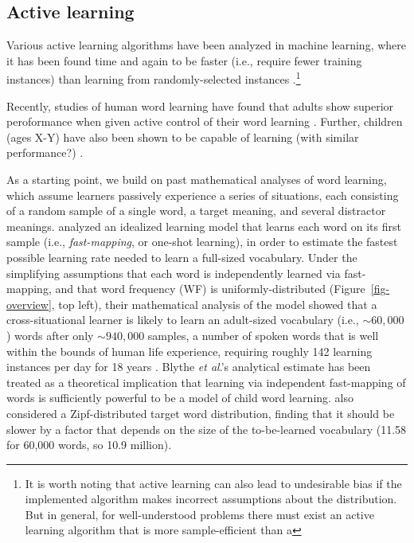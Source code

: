 \documentclass[a4paper,natbib,man]{apa6}
\begin{document}
\citep{gottlieb2018towards}

\subsection{Active learning}
Various active learning algorithms have been analyzed in machine learning, where it has been found time and again to be faster (i.e., require fewer training instances) than learning from randomly-selected instances \citep{Settles:2012}.\footnote{It is worth noting that active learning can also lead to undesirable bias if the implemented algorithm makes incorrect assumptions about the distribution. But in general, for well-understood problems there must exist an active learning algorithm that is more sample-efficient than a }

Recently, studies of human word learning have found that adults show superior peroformance when given active control of their word learning \citep{Kachergis:2013, zettersten2021sampling}.
Further, children (ages X-Y) have also been shown to be capable of learning (with similar performance?) \citep{zettersten2021sampling}.

\citep{clerkin2019everyday}

As a starting point, we build on past mathematical analyses of word learning, which assume learners passively experience a series of situations, each consisting of a random sample of a single word, a target meaning, and several distractor meanings. 
\cite{Blythe:2010,Blythe:2016} analyzed an idealized learning model that learns each word on its first sample (i.e., {\it fast-mapping}, or one-shot learning), in order to estimate the fastest possible learning rate needed to learn a full-sized vocabulary.
Under the simplifying assumptions that each word is independently learned via fast-mapping, and that word frequency (WF) is uniformly-distributed (Figure~\ref{fig-overview}, top left), their mathematical analysis of the model showed that a cross-situational learner is likely to learn an adult-sized vocabulary (i.e., $\sim60,000$) words after only $\sim940,000$ samples, a number of spoken words that is well within the bounds of human life experience, requiring roughly 142 learning instances per day for 18 years \citep{Blythe:2010}. %
Blythe \textit{et al}.'s analytical estimate has been treated as a theoretical implication that learning via independent fast-mapping of words is sufficiently powerful to be a model of child word learning. 
\cite{Blythe:2010} also considered a Zipf-distributed target word distribution, finding that it should be slower by a factor that depends on the size of the to-be-learned vocabulary (11.58 for 60,000 words, so 10.9 million). %
\end{document}
